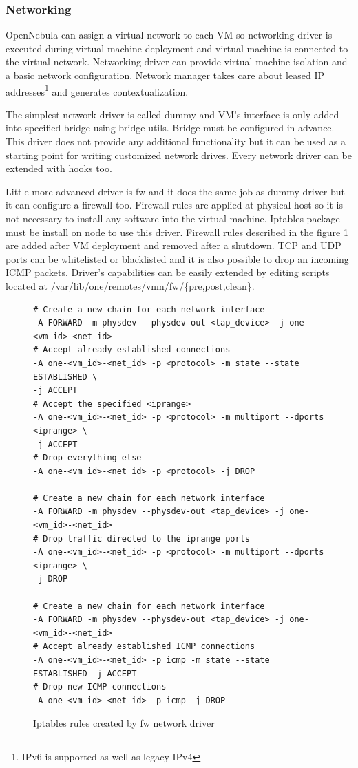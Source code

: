 \subsubsection{Networking}
OpenNebula can assign a virtual network to each \Ac{VM} so networking driver is executed during virtual machine deployment and virtual machine is connected to the virtual network. Networking driver can provide virtual machine isolation and a basic network configuration. Network manager takes care about leased \Ac{IP} addresses\footnote{\Ac{IPv6} is supported as well as legacy \Ac{IPv4}} and generates contextualization.

The simplest network driver is called dummy and \Ac{VM}'s interface is only added into specified bridge using bridge-utils. Bridge must be configured in advance. This driver does not provide any additional functionality but it can be used as a starting point for writing customized network drives. Every network driver can be extended with hooks too.

Little more advanced driver is fw and it does the same job as dummy driver but it can configure a firewall too. Firewall rules are applied at physical host so it is not necessary to install any software into the virtual machine. Iptables package must be install on node to use this driver. Firewall rules described in the figure \ref{code:fw} are added after \Ac{VM} deployment and removed after a shutdown. \Ac{TCP} and \Ac{UDP} ports can be whitelisted or blacklisted and it is also possible to drop an incoming \Ac{ICMP} packets. Driver's capabilities can be easily extended by editing scripts located at /var/lib/one/remotes/vnm/fw/\{pre,post,clean\}.

\begin{figure}[htb]
\caption{Iptables rules created by fw network driver}
\label{code:fw}
\begin{verbatim}
# Create a new chain for each network interface
-A FORWARD -m physdev --physdev-out <tap_device> -j one-<vm_id>-<net_id>
# Accept already established connections
-A one-<vm_id>-<net_id> -p <protocol> -m state --state ESTABLISHED \
-j ACCEPT
# Accept the specified <iprange>
-A one-<vm_id>-<net_id> -p <protocol> -m multiport --dports <iprange> \
-j ACCEPT
# Drop everything else
-A one-<vm_id>-<net_id> -p <protocol> -j DROP

# Create a new chain for each network interface
-A FORWARD -m physdev --physdev-out <tap_device> -j one-<vm_id>-<net_id>
# Drop traffic directed to the iprange ports
-A one-<vm_id>-<net_id> -p <protocol> -m multiport --dports <iprange> \
-j DROP

# Create a new chain for each network interface
-A FORWARD -m physdev --physdev-out <tap_device> -j one-<vm_id>-<net_id>
# Accept already established ICMP connections
-A one-<vm_id>-<net_id> -p icmp -m state --state ESTABLISHED -j ACCEPT
# Drop new ICMP connections
-A one-<vm_id>-<net_id> -p icmp -j DROP
\end{verbatim}
\end{figure}

